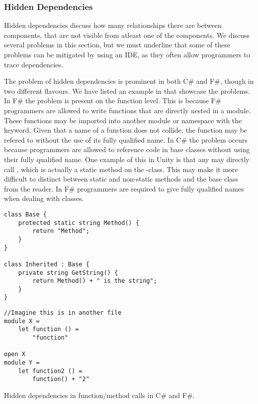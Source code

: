 \subsubsection{Hidden Dependencies}
Hidden dependencies discuss how many relationships there are between components, that are not visible from atleast one of the components. We discuss several problems in this section, but we must underline that some of these problems can be mitigated by using an \gls{IDE}, as they often allow programmers to trace dependencies.

The problem of hidden dependencies is prominent in both C\# and F\#, though in two different flavours. We have listed an example in  that showcase the problems. In F\# the problem is present on the function level. This is because F\# programmers are allowed to write functions that are directly nested in a module. These functions may be imported into another module or namespace with the  keyword. Given that a name of a function does not collide, the function may be refered to without the use of its fully qualified name. In C\# the problem occurs because programmers are allowed to reference code in base classes without using their fully qualified name. One example of this in Unity is that any  may directly call , which is actually a static method on the -class. This may make it more difficult to distinct between static and non-static methods and  the base class from the reader. In F\# programmers are required to give fully qualified names when dealing with classes.

\begin{listing}[H]
    \begin{minipage}{.50\textwidth}
        \begin{verbatim}
class Base {
    protected static string Method() {
        return "Method";
    }
}

class Inherited : Base {
    private string GetString() {
        return Method() + " is the string";
    }
}
        \end{verbatim}
    \end{minipage}
    \hfill
    \begin{minipage}{.40\textwidth}
        \begin{verbatim}
//Imagine this is in another file
module X =
    let function () =
        "function"

open X
module Y =
    let function2 () =
        function() + "2"
        \end{verbatim}
    \end{minipage}
\caption{Hidden dependencies in function/method calls in C\# and F\#.}
\label{lst:hidden:dependencies}
\end{listing}

